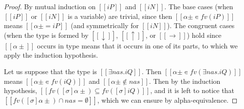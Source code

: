 \lemmaSubstFvImage*
\begin{proof}
  By mutual induction on $[[iP]]$ and $[[iN]]$.
  The base cases (when $[[iP]]$ or $[[iN]]$ is a variable) 
  are trivial, since then $[[α± ∊ fv(iP)]]$ means 
  $[[α± = iP]]$ (and symmetrically for $[[iN]]$).
  The congruent cases 
  (when the type is formed by $[[↓]]$, $[[↑]]$, or $[[→]]$)
  hold since $[[α±]]$ occurs in type means that it occurs
  in one of its parts, to which we apply the induction hypothesis.

  Let us suppose that the type is $[[∃nas.iQ]]$.
  Then $[[α± ∊ fv(∃nas.iQ)]]$ means
  $[[α± ∊ fv(iQ)]]$ and $[[α± ∉ {nas}]]$.
  Then by the induction hypothesis, 
  $[[ fv([σ]α±) ⊆ fv([σ]iQ) ]]$,
  and it is left to notice that $[[ fv([σ]α±) ∩ {nas} = ∅ ]]$,
  which we can ensure by alpha-equivalence.
\end{proof}
